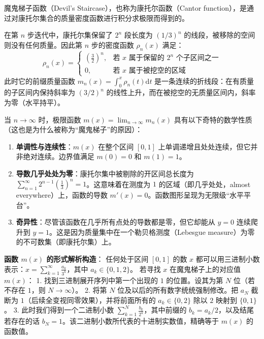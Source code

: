\begin{solution}
魔鬼梯子函数（Devil's Staircase），也称为康托尔函数（Cantor function），是通过对康托尔集合的质量密度函数进行积分求极限而得到的。

在第 $n$ 步迭代中，康托尔集保留了 $2^n$ 段长度为 $(1/3)^n$ 的线段，被移除的空间则没有任何质量。因此第 $n$ 步的密度函数 $\rho_n(x)$ 满足：
$$ \rho_n(x) = \begin{cases} \left(\frac{3}{2}\right)^n, & \text{若 } x \text{ 属于保留的 } 2^n \text{ 个子区间之一} \\ 0, & \text{若 } x \text{ 属于被挖空的区域} \end{cases} $$
此时它的前缀质量函数 $m_n(x) = \int_0^x \rho_n(t) \mathrm{d}t$ 是一条连续的折线段：在有质量的子区间内保持斜率为 $(3/2)^n$ 的线性上升，而在被挖空的无质量区间内，斜率为零（水平持平）。

当 $n \to \infty$ 时，极限函数 $m(x) = \lim_{n \to \infty} m_n(x)$ 具有以下奇特的数学性质（这也是为什么被称为“魔鬼梯子”的原因）：
\begin{enumerate}
    \item \textbf{单调性与连续性}：$m(x)$ 在整个区间 $[0,1]$ 上单调递增且处处连续，但它并非绝对连续。边界值满足 $m(0)=0$ 和 $m(1)=1$。
    \item \textbf{导数几乎处处为零}：康托尔集中被剔除的开区间总长度为 $\sum_{n=1}^\infty 2^{n-1} \left(\frac{1}{3}\right)^n = 1$。这意味着在测度为 $1$ 的区域（即几乎处处，almost everywhere）上，函数的导数 $m'(x) = 0$。函数图形呈现为无限级“水平平台”。
    \item \textbf{奇异性}：尽管该函数在几乎所有点处的导数都是零，但它却能从 $y=0$ 连续爬升到 $y=1$。这是因为质量集中在一个勒贝格测度（Lebesgue measure）为零的不可数集（即康托尔集）上。
\end{enumerate}

\textbf{函数 $m(x)$ 的形式解析构造}：
任何处于区间 $[0,1]$ 的数 $x$ 都可以用三进制小数表示：$x = \sum_{k=1}^\infty \frac{a_k}{3^k}$，其中 $a_k \in \{0, 1, 2\}$。
若寻找 $x$ 在魔鬼梯子上的对应值 $m(x)$：
1. 找到三进制展开序列中第一个出现的 $1$ 的位置。设其为第 $N$ 位（若不存在 $1$，则 $N \to \infty$）。
2. 将第 $N$ 位及以后的所有数字统统强制修改。把 $a_N$ 截断为 $1$（后续全变视同零效果），并将前面所有的 $a_k \in \{0,2\}$ 除以 $2$ 映射到 $\{0,1\}$。
3. 此时我们得到一个二进制小数 $\sum_{k=1}^N \frac{b_k}{2^k}$，其中前缀的 $b_k = a_k / 2$，以及结尾若存在的话 $b_N = 1$。该二进制小数所代表的十进制实数值，精确等于 $m(x)$ 的函数值。
\end{solution}

